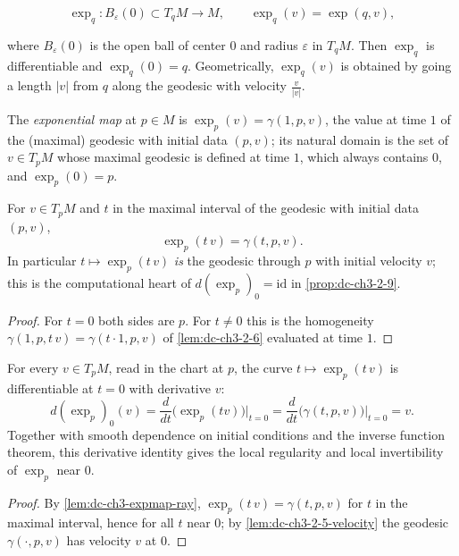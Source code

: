 $$
\exp_q:B_\varepsilon(0)\subset T_qM\to M,\qquad\exp_q(v)=\exp(q,v),
$$

where $B_\varepsilon(0)$ is the open ball of center $0$ and radius $\varepsilon$
in $T_qM$. Then $\exp_q$ is differentiable and $\exp_q(0)=q$. Geometrically,
$\exp_q(v)$ is obtained by going a length $|v|$ from $q$ along the geodesic with
velocity $\frac{v}{|v|}$.

\begin{definition}
  \label{def:dc-ch3-expmap}


  The \emph{exponential map} at $p\in M$ is $\exp_p(v)=\gamma(1,p,v)$, the value at
  time $1$ of the (maximal) geodesic with initial data $(p,v)$; its natural
  domain is the set of $v\in T_pM$ whose maximal geodesic is defined at time
  $1$, which always contains $0$, and $\exp_p(0)=p$.

\end{definition}

\begin{lemma}
  \label{lem:dc-ch3-expmap-ray}


  For $v\in T_pM$ and $t$ in the maximal interval of the geodesic with initial
  data $(p,v)$,
  $$\exp_p(t\,v)=\gamma(t,p,v).$$
  In particular $t\mapsto\exp_p(t\,v)$ \emph{is} the geodesic through $p$ with
  initial velocity $v$; this is the computational heart of
  $d(\exp_p)_0=\mathrm{id}$ in \cref{prop:dc-ch3-2-9}.
\end{lemma}
\begin{proof}
  \sketch

  For $t=0$ both sides are $p$. For $t\neq0$ this is the homogeneity
  $\gamma(1,p,t\,v)=\gamma(t\cdot 1,p,v)$ of \cref{lem:dc-ch3-2-6} evaluated at
  time $1$.
\end{proof}

\begin{lemma}[$d(\exp_p)_0=\mathrm{id}$ along rays]
  \label{lem:dc-ch3-2-9-dexp}


  For every $v\in T_pM$, read in the chart at $p$, the curve
  $t\mapsto\exp_p(t\,v)$ is differentiable at $t=0$ with derivative $v$:
  $$
  d(\exp_p)_0(v)=\frac{d}{dt}\big(\exp_p(tv)\big)\Big|_{t=0}
    =\frac{d}{dt}\big(\gamma(t,p,v)\big)\Big|_{t=0}=v.
  $$
  Together with smooth dependence on initial conditions and the inverse function
  theorem, this derivative identity gives the local regularity and local
  invertibility of $\exp_p$ near $0$.
\end{lemma}
\begin{proof}
  \sketch

  By \cref{lem:dc-ch3-expmap-ray}, $\exp_p(t\,v)=\gamma(t,p,v)$ for $t$ in the
  maximal interval, hence for all $t$ near $0$; by
  \cref{lem:dc-ch3-2-5-velocity} the geodesic $\gamma(\cdot,p,v)$ has velocity
  $v$ at $0$.
\end{proof}

